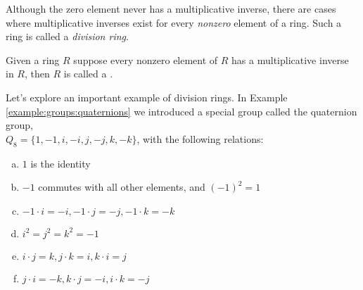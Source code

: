 %


Although the zero element never has a multiplicative inverse, there are cases where multiplicative inverses exist for every \emph{nonzero} element of a ring. Such a ring is called a \emph{division ring}. 

\begin{defn} \label{def:divisionring}
Given a ring $R$ suppose every nonzero element of $R$ has a multiplicative inverse in $R$, then $R$ is called a .
\end{defn}

Let's explore an important example of division rings.  In Example \ref{example:groups:quaternions} we introduced a special group called the quaternion group,\\ $Q_8=\{1,-1,i,-i,j,-j,k,-k\}$, with the following relations:
\begin{enumerate}[(a)]
\item
$1$ is the identity
\item
$-1$ commutes with all other elements, and $(-1)^2=1$
\item
$-1 \cdot i = -i, -1 \cdot j = -j, -1 \cdot k = -k$
\item
$i^2 = j^2=k^2 = -1$
\item
$i \cdot j = k, j \cdot k = i, k \cdot i=j$
\item
$j \cdot i = -k, k \cdot j=-i, i \cdot k = -j$ 
\end{enumerate}


